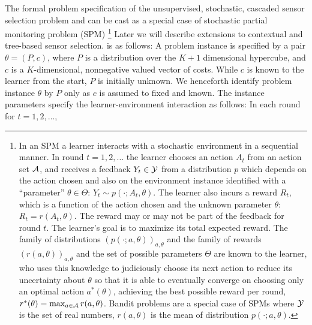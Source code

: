 \newcommand{\ind}[1]{\mathbb{I}\{#1\}}
%
\vspace{-5pt}
The formal problem specification of the unsupervised, stochastic, 
cascaded sensor selection problem and can be cast as a special case of stochastic partial monitoring problem (SPM) \footnote{In an SPM a learner interacts with a stochastic environment in a sequential manner.
In round $t=1,2,\dots$ the learner chooses an action $A_t$ from an action set $\mathcal{A}$, and receives a feedback $Y_t\in \mathcal{Y}$
from a distribution $p$ which depends on the action chosen and also on the environment instance identified
with a ``parameter'' $\theta\in\Theta$:
$Y_t \sim p(\cdot;A_t,\theta)$. 
The learner also incurs a reward $R_t$, which is a function of the action chosen and the unknown parameter $\theta$:
$R_t = r(A_t,\theta)$. 
The reward may or may not be part of the feedback for round $t$.
The learner's goal is to maximize its total expected reward.
The family of distributions $(p(\cdot;a,\theta))_{a,\theta}$ and the family of rewards $(r(a,\theta))_{a,\theta}$
and the set of possible parameters $\Theta$ are known to the learner, who uses this knowledge to judiciously choose
its next action to reduce its uncertainty about $\theta$ so that it is able to eventually converge on choosing only an 
optimal action $a^*(\theta)$, achieving the best possible reward per round, $r^*(\theta) = \max_{a\in \mathcal{A}} r(a,\theta)$.  Bandit problems are a special case of SPMs where $\mathcal{Y}$ is the set of real numbers, $r(a,\theta)$ is the mean of distribution $p(\cdot;a,\theta)$.}
Later we will describe extensions to contextual and tree-based sensor selection. 
is as follows: 
A problem instance is specified by a pair $\theta = (P,c)$, where $P$ is
a distribution over the $K+1$ dimensional hypercube, and $c$ is a $K$-dimensional, nonnegative valued vector
of costs.
While $c$ is known to the learner from the start, $P$ is initially unknown. We henceforth identify problem instance $\theta$ by $P$ only as $c$ is assumed to fixed and known. 
The instance parameters specify the learner-environment interaction as follows:
In each round for $t=1,2,\dots$, 
